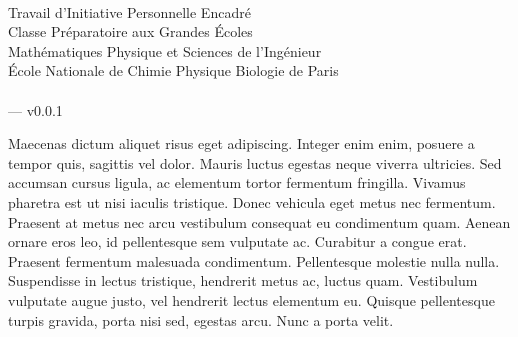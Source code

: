 %
%

\begin{titlepage}

\makeatletter
  \begin{flushright}
      {\textbf {\huge \@title}}\\
    \vspace{3em}
      {\Large Travail d'Initiative Personnelle Encadré}\\
      Classe Préparatoire aux Grandes Écoles\\
      Mathématiques Physique et Sciences de l'Ingénieur\\
      École Nationale de Chimie Physique Biologie de Paris\\
    \vspace{3em}
      {\large \@author}\\
      {\small \@date \space --- v0.0.1}
  \end{flushright}
\makeatother

\vfill

Maecenas dictum aliquet risus eget adipiscing. Integer enim enim, posuere a tempor quis, sagittis vel dolor. Mauris luctus egestas neque viverra ultricies. Sed accumsan cursus ligula, ac elementum tortor fermentum fringilla. Vivamus pharetra est ut nisi iaculis tristique. Donec vehicula eget metus nec fermentum. Praesent at metus nec arcu vestibulum consequat eu condimentum quam. Aenean ornare eros leo, id pellentesque sem vulputate ac. Curabitur a congue erat. Praesent fermentum malesuada condimentum. Pellentesque molestie nulla nulla. Suspendisse in lectus tristique, hendrerit metus ac, luctus quam. Vestibulum vulputate augue justo, vel hendrerit lectus elementum eu. Quisque pellentesque turpis gravida, porta nisi sed, egestas arcu. Nunc a porta velit.

\end{titlepage}

\tableofcontents
